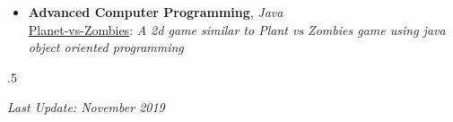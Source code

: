 \documentclass[margin]{res}
\begin{document}
\begin{resume}
\begin{itemize}
\item \textbf{Advanced Computer Programming}, {\sl Java}\\
\href{https://github.com/aliyazdi75/Planet\_vs\_Zombies}{Planet-vs-Zombies}: \textit{A 2d game similar to Plant vs Zombies game using java object oriented programming}

\end{itemize}


\moveleft.5\hoffset\centerline{\textit{Last Update: November 2019}}

\end{resume}
\end{document}
